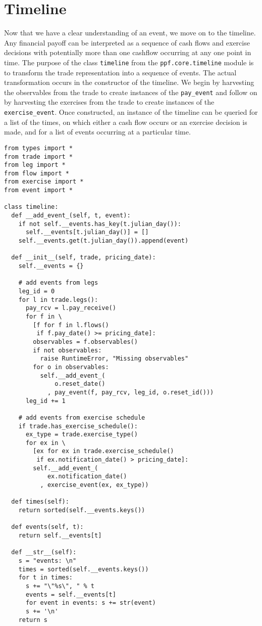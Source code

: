 \section{Timeline}
Now that we have a clear understanding of an event, we move on to the
timeline. Any financial payoff can be interpreted as a sequence of
cash flows and exercise decisions with potentially more than one
cashflow occurring at any one point in time. The purpose of the class
\verb|timeline| from the \verb|ppf.core.timeline| module is to
transform the trade representation into a sequence of events. The
actual transformation occurs in the constructor of the timeline. We
begin by harvesting the observables from the trade to create instances
of the \verb|pay_event| and follow on by harvesting the exercises from
the trade to create instances of the \verb|exercise_event|. Once
constructed, an instance of the timeline can be queried for a list of
the times, on which either a cash flow occurs or an exercise decision
is made, and for a list of events occurring at a particular time.
\begin{verbatim}
from types import *
from trade import *
from leg import *
from flow import *
from exercise import *
from event import *

class timeline:
  def __add_event_(self, t, event):
    if not self.__events.has_key(t.julian_day()):
      self.__events[t.julian_day()] = []
    self.__events.get(t.julian_day()).append(event)

  def __init__(self, trade, pricing_date):
    self.__events = {}

    # add events from legs
    leg_id = 0
    for l in trade.legs():
      pay_rcv = l.pay_receive()
      for f in \
        [f for f in l.flows()
         if f.pay_date() >= pricing_date]:
        observables = f.observables()
        if not observables:
          raise RuntimeError, "Missing observables"
        for o in observables:
          self.__add_event_(
              o.reset_date()
            , pay_event(f, pay_rcv, leg_id, o.reset_id()))
      leg_id += 1

    # add events from exercise schedule
    if trade.has_exercise_schedule():
      ex_type = trade.exercise_type()
      for ex in \
        [ex for ex in trade.exercise_schedule()
         if ex.notification_date() > pricing_date]:
        self.__add_event_(
            ex.notification_date()
          , exercise_event(ex, ex_type))

  def times(self):
    return sorted(self.__events.keys())

  def events(self, t):
    return self.__events[t]

  def __str__(self):
    s = "events: \n"
    times = sorted(self.__events.keys())
    for t in times:
      s += "\"%s\", " % t
      events = self.__events[t]
      for event in events: s += str(event)
      s += '\n'
    return s
\end{verbatim}
